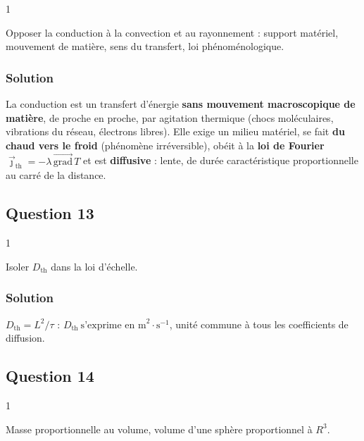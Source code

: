 \documentclass[11pt,a4paper]{article}
\begin{document}
\begin{indication}{1}

Opposer la conduction à la convection et au rayonnement : support matériel, mouvement de matière, sens du transfert, loi phénoménologique.

\end{indication}

\hypertarget{solution-11}{%
\subsubsection{Solution}\label{solution-11}}

La conduction est un transfert d'énergie \textbf{sans mouvement macroscopique de matière}, de proche en proche, par agitation thermique (chocs moléculaires, vibrations du réseau, électrons libres). Elle exige un milieu matériel, se fait \textbf{du chaud vers le froid} (phénomène irréversible), obéit à la \textbf{loi de Fourier} \(\vec\jmath_{\mathrm{th}}=-\lambda\,\overrightarrow{\mathrm{grad}}\,T\) et est \textbf{diffusive} : lente, de durée caractéristique proportionnelle au carré de la distance.

\hypertarget{question-13}{%
\subsection{Question 13}\label{question-13}}

\begin{indication}{1}

Isoler \(D_{\mathrm{th}}\) dans la loi d'échelle.

\end{indication}

\hypertarget{solution-12}{%
\subsubsection{Solution}\label{solution-12}}

\(D_{\mathrm{th}}=L^2/\tau\) : \(\boxed{D_{\mathrm{th}}\ \text{s'exprime en m}^2\cdot\text{s}^{-1}}\), unité commune à tous les coefficients de diffusion.

\hypertarget{question-14}{%
\subsection{Question 14}\label{question-14}}

\begin{indication}{1}

Masse proportionnelle au volume, volume d'une sphère proportionnel à \(R^3\).

\end{indication}
\end{document}
